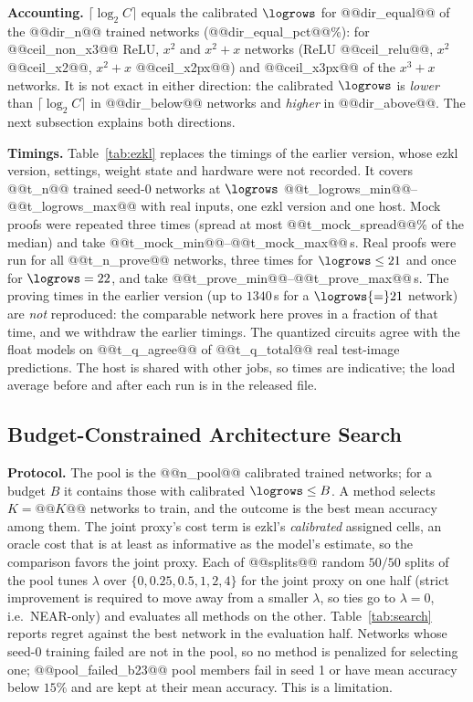 \textbf{Accounting.}  $\lceil\log_2 C\rceil$ equals the calibrated $\logrows$ for @@dir_equal@@ of the @@dir_n@@ trained networks (@@dir_equal_pct@@\%): for @@ceil_non_x3@@ ReLU, $x^2$ and $x^2{+}x$ networks (ReLU @@ceil_relu@@, $x^2$ @@ceil_x2@@, $x^2{+}x$ @@ceil_x2px@@) and
@@ceil_x3px@@ of the $x^3{+}x$ networks.  It is not exact in either direction: the calibrated $\logrows$ is \emph{lower} than $\lceil\log_2 C\rceil$ in @@dir_below@@ networks and \emph{higher} in @@dir_above@@.  The next subsection explains both directions.

\textbf{Timings.}  Table~\ref{tab:ezkl} replaces the timings of the earlier version, whose ezkl version, settings, weight state and hardware were not recorded.  It covers @@t_n@@ trained seed-0 networks at $\logrows$ @@t_logrows_min@@--@@t_logrows_max@@
with real inputs, one ezkl version and one host.  Mock proofs were repeated three times (spread at most @@t_mock_spread@@\% of the median) and take @@t_mock_min@@--@@t_mock_max@@\,s.
Real proofs were run for all @@t_n_prove@@ networks, three times for $\logrows\le21$ and once for $\logrows=22$, and take @@t_prove_min@@--@@t_prove_max@@\,s.
The proving times in the earlier version (up to $1340$\,s for a $\logrows{=}21$ network) are \emph{not} reproduced: the comparable network here proves in a fraction of that time, and we withdraw the earlier timings.
The quantized circuits agree with the float models on @@t_q_agree@@ of @@t_q_total@@ real test-image predictions.  The host is shared with other jobs, so times are indicative; the load average before and after each run is in the released file.




\subsection{Budget-Constrained Architecture Search}

\textbf{Protocol.}  The pool is the @@n_pool@@ calibrated trained networks; for a budget $B$ it contains those with calibrated $\logrows\le B$.  A method selects $K=@@K@@$ networks to train, and the outcome is the best mean accuracy among them.
The joint proxy's cost term is ezkl's \emph{calibrated} assigned cells, an oracle cost that is at least as informative as the model's estimate, so the comparison favors the joint proxy.
Each of @@splits@@ random $50/50$ splits of the pool tunes $\lambda$ over $\{0,0.25,0.5,1,2,4\}$ for the joint proxy on one half (strict improvement is required to move away from a smaller $\lambda$, so ties go to $\lambda=0$, i.e.\ NEAR-only) and evaluates all methods on the other.  Table~\ref{tab:search} reports regret against the best network in the evaluation half.
Networks whose seed-0 training failed are not in the pool, so no method is penalized for selecting one; @@pool_failed_b23@@ pool members fail in seed 1 or have mean accuracy below $15\%$ and are kept at their mean accuracy.  This is a limitation.


